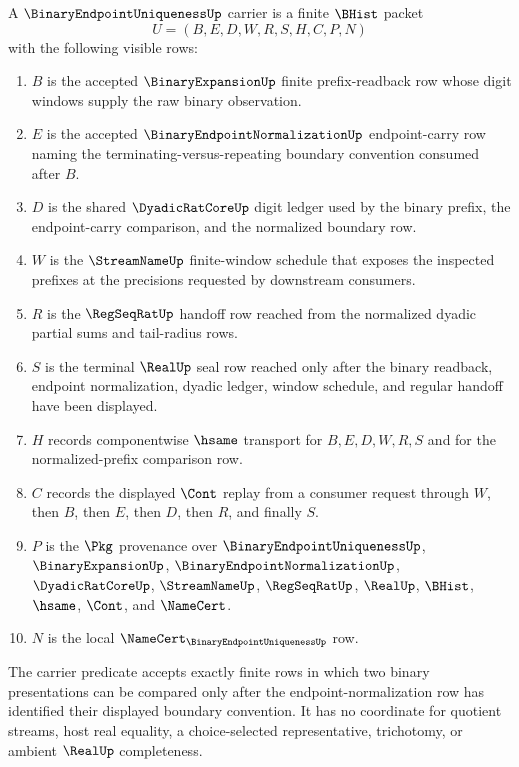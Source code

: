 \begin{definition}
\label{def:binary-endpoint-uniqueness-carrier}
A $\BinaryEndpointUniquenessUp$ carrier is a finite $\BHist$ packet
$$
U=(B,E,D,W,R,S,H,C,P,N)
$$
with the following visible rows:
\begin{enumerate}
\item $B$ is the accepted $\BinaryExpansionUp$ finite prefix-readback row whose digit windows supply the raw binary observation.
\item $E$ is the accepted $\BinaryEndpointNormalizationUp$ endpoint-carry row naming the terminating-versus-repeating boundary convention consumed after $B$.
\item $D$ is the shared $\DyadicRatCoreUp$ digit ledger used by the binary prefix, the endpoint-carry comparison, and the normalized boundary row.
\item $W$ is the $\StreamNameUp$ finite-window schedule that exposes the inspected prefixes at the precisions requested by downstream consumers.
\item $R$ is the $\RegSeqRatUp$ handoff row reached from the normalized dyadic partial sums and tail-radius rows.
\item $S$ is the terminal $\RealUp$ seal row reached only after the binary readback, endpoint normalization, dyadic ledger, window schedule, and regular handoff have been displayed.
\item $H$ records componentwise $\hsame$ transport for $B,E,D,W,R,S$ and for the normalized-prefix comparison row.
\item $C$ records the displayed $\Cont$ replay from a consumer request through $W$, then $B$, then $E$, then $D$, then $R$, and finally $S$.
\item $P$ is the $\Pkg$ provenance over $\BinaryEndpointUniquenessUp$, $\BinaryExpansionUp$, $\BinaryEndpointNormalizationUp$, $\DyadicRatCoreUp$, $\StreamNameUp$, $\RegSeqRatUp$, $\RealUp$, $\BHist$, $\hsame$, $\Cont$, and $\NameCert$.
\item $N$ is the local $\NameCert_{\BinaryEndpointUniquenessUp}$ row.
\end{enumerate}
The carrier predicate accepts exactly finite rows in which two binary presentations can be compared only after the endpoint-normalization row has identified their displayed boundary convention. It has no coordinate for quotient streams, host real equality, a choice-selected representative, trichotomy, or ambient $\RealUp$ completeness.
\end{definition}

